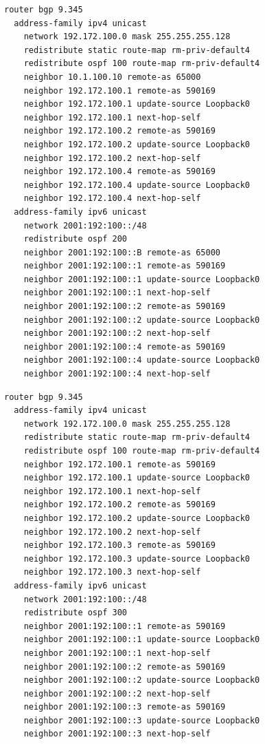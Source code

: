 \documentclass[11pt,a4paper]{report}
\begin{document}
\begin{lstlisting}[caption=Internal BGP  \& OSPF Redistribute - Router Aveiro]
router bgp 9.345
  address-family ipv4 unicast
  	network 192.172.100.0 mask 255.255.255.128
  	redistribute static route-map rm-priv-default4
  	redistribute ospf 100 route-map rm-priv-default4
  	neighbor 10.1.100.10 remote-as 65000
    neighbor 192.172.100.1 remote-as 590169
	neighbor 192.172.100.1 update-source Loopback0
 	neighbor 192.172.100.1 next-hop-self
 	neighbor 192.172.100.2 remote-as 590169
 	neighbor 192.172.100.2 update-source Loopback0
 	neighbor 192.172.100.2 next-hop-self
 	neighbor 192.172.100.4 remote-as 590169
 	neighbor 192.172.100.4 update-source Loopback0
  	neighbor 192.172.100.4 next-hop-self
  address-family ipv6 unicast
  	network 2001:192:100::/48
  	redistribute ospf 200
  	neighbor 2001:192:100::B remote-as 65000
  	neighbor 2001:192:100::1 remote-as 590169
 	neighbor 2001:192:100::1 update-source Loopback0
 	neighbor 2001:192:100::1 next-hop-self
 	neighbor 2001:192:100::2 remote-as 590169
 	neighbor 2001:192:100::2 update-source Loopback0
 	neighbor 2001:192:100::2 next-hop-self
 	neighbor 2001:192:100::4 remote-as 590169
 	neighbor 2001:192:100::4 update-source Loopback0
 	neighbor 2001:192:100::4 next-hop-self
\end{lstlisting}

\begin{lstlisting}[caption=Internal BGP  \& OSPF Redistribute - Router Faro]
router bgp 9.345
  address-family ipv4 unicast
  	network 192.172.100.0 mask 255.255.255.128
  	redistribute static route-map rm-priv-default4
  	redistribute ospf 100 route-map rm-priv-default4
    neighbor 192.172.100.1 remote-as 590169
	neighbor 192.172.100.1 update-source Loopback0
 	neighbor 192.172.100.1 next-hop-self
 	neighbor 192.172.100.2 remote-as 590169
 	neighbor 192.172.100.2 update-source Loopback0
 	neighbor 192.172.100.2 next-hop-self
 	neighbor 192.172.100.3 remote-as 590169
 	neighbor 192.172.100.3 update-source Loopback0
  	neighbor 192.172.100.3 next-hop-self
  address-family ipv6 unicast
  	network 2001:192:100::/48
  	redistribute ospf 300
  	neighbor 2001:192:100::1 remote-as 590169
 	neighbor 2001:192:100::1 update-source Loopback0
 	neighbor 2001:192:100::1 next-hop-self
 	neighbor 2001:192:100::2 remote-as 590169
 	neighbor 2001:192:100::2 update-source Loopback0
 	neighbor 2001:192:100::2 next-hop-self
 	neighbor 2001:192:100::3 remote-as 590169
 	neighbor 2001:192:100::3 update-source Loopback0
 	neighbor 2001:192:100::3 next-hop-self
\end{lstlisting}
\end{document}
